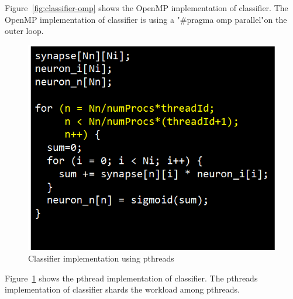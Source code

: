 Figure~\ref{fig:classifier-omp} shows the OpenMP implementation of 
classifier. The OpenMP implementation of classifier is using a 
"\#pragma omp parallel"on the outer loop. 


\begin{figure}
  \begin{center}
    \includegraphics[width=\linewidth]{cs758-figs/classifier-pthread.png}
  \end{center}
\vspace{-0.2in}
  \caption{Classifier implementation using pthreads}
  \label{fig:classifier-pthread}
\vspace{-0.05in}
\end{figure}

Figure~\ref{fig:classifier-pthread} shows the pthread implementation of 
classifier. The pthreads implementation of classifier shards the 
workload among pthreads. 


